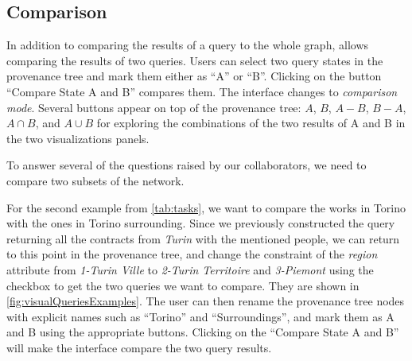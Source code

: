 \subsection{Comparison}

In addition to comparing the results of a query to the whole graph, \name allows comparing the results of two queries.
Users can select two query states in the provenance tree and mark them either as ``A'' or ``B''.
Clicking on the button ``Compare State A and B'' compares them.
The interface changes to \emph{comparison mode}.
Several buttons appear on top of the provenance tree: $A$, $B$, $A-B$, $B-A$, $A \cap B$, and $A \cup B$ for exploring the combinations of the two results of A and B in the two visualizations panels.

To answer several of the questions raised by our collaborators, we need to compare two subsets of the network.

For the second example from \autoref{tab:tasks}, we want to compare the works in Torino with the ones in Torino surrounding.
Since we previously constructed the query returning all the contracts from \textit{Turin} with the mentioned people, we can
return to this point in the provenance tree, and change the constraint of the \textit{region} attribute from \textit{1-Turin Ville} to \textit{2-Turin Territoire} and \textit{3-Piemont} using the checkbox to get the two queries we want to compare. They are shown in \autoref{fig:visualQueriesExamples}.
The user can then rename the provenance tree nodes with explicit names such as ``Torino'' and ``Surroundings'', and mark them as A and B using the appropriate buttons.
Clicking on the ``Compare State A and B'' will make the interface compare the two query results.




